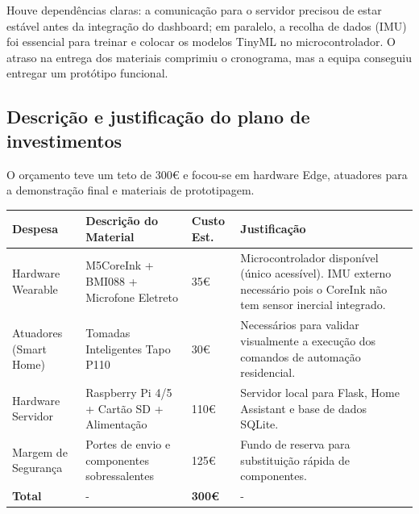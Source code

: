 \documentclass[11pt, a4paper]{article}
\begin{document}
Houve dependências claras: a comunicação para o servidor precisou de estar estável antes da integração do dashboard; em paralelo, a recolha de dados (IMU) foi essencial para treinar e colocar os modelos TinyML no microcontrolador. O atraso na entrega dos materiais comprimiu o cronograma, mas a equipa conseguiu entregar um protótipo funcional.

\subsection{Descrição e justificação do plano de investimentos}
O orçamento teve um teto de 300€ e focou-se em hardware Edge, atuadores para a demonstração final e materiais de prototipagem.

\begin{table}[H]
    \small
    \centering
    \begin{tabular}{|p{}|p{}|p{}|p{}|}
        \hline
        \cellcolor{lightgray}\textbf{Despesa} &
        \cellcolor{lightgray}\textbf{Descrição do Material} &
        \cellcolor{lightgray}\textbf{Custo Est.} &
        \cellcolor{lightgray}\textbf{Justificação} \\
        \hline
        Hardware Wearable & M5CoreInk + BMI088 + Microfone Eletreto & 35€ & Microcontrolador disponível (único acessível). IMU externo necessário pois o CoreInk não tem sensor inercial integrado. \\
        \hline
        Atuadores (Smart Home) & Tomadas Inteligentes Tapo P110 & 30€ & Necessários para validar visualmente a execução dos comandos de automação residencial. \\
        \hline
        Hardware Servidor & Raspberry Pi 4/5 + Cartão SD + Alimentação & 110€ & Servidor local para Flask, Home Assistant e base de dados SQLite. \\
        \hline
        Margem de Segurança & Portes de envio e componentes sobressalentes & 125€ & Fundo de reserva para substituição rápida de componentes. \\
        \hline
        \textbf{Total} & - & \textbf{300€} & - \\
        \hline
    \end{tabular}
\end{table}
\end{document}

